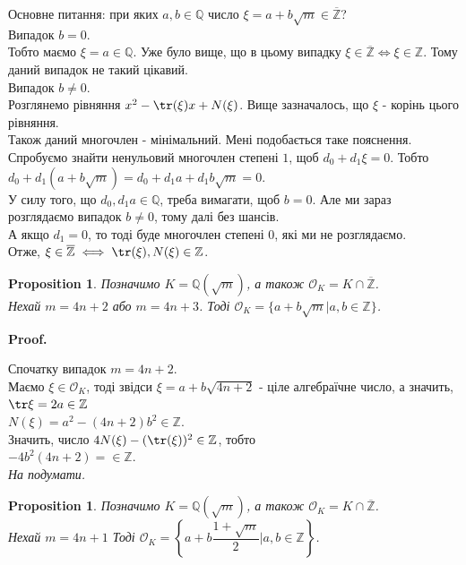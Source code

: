 \documentclass[a4paper, 10pt]{article}
\makeatletter
\theoremstyle{theoremdd}
\theoremstyle{theoremdd}
\theoremstyle{theoremdd}
\theoremstyle{theoremdd}
\theoremstyle{theoremdd}
\newtheorem{proposition}[theorem]{Proposition}
\theoremstyle{theoremdd}
\theoremstyle{theoremdd}
\theoremstyle{theoremdd}
\renewenvironment{proof}[1][Proof.\\]{\par
\pushQED{\hfill \qed}%
\normalfont \topsep6\p@\@plus6\p@\relax
\trivlist
\item\relax
{\bfseries
#1\@addpunct{.}}\hspace\labelsep\ignorespaces
}{%
\popQED\endtrivlist\@endpefalse
}
\makeatother
\begin{document}
Основне питання: при яких $a,b \in \mathbb{Q}$ число $\xi = a + b\sqrt{m} \in \overline{\mathbb{Z}}$?\\
Випадок $b = 0$.\\
Тобто маємо $\xi = a \in \mathbb{Q}$. Уже було вище, що в цьому випадку $\xi \in \overline{\mathbb{Z}} \iff \xi \in \mathbb{Z}$. Тому даний випадок не такий цікавий.
\bigskip \\
Випадок $b \neq 0$.\\
Розглянемо рівняння $x^2 - \tr(\xi)x + N(\xi)$. Вище зазначалось, що $\xi$ - корінь цього рівняння.\\
Також даний многочлен - мінімальний. Мені подобається таке пояснення.\\
Спробуємо знайти ненульовий многочлен степені $1$, щоб $d_0+d_1 \xi = 0$. Тобто\\
$d_0 + d_1 (a+b\sqrt{m}) = d_0 +d_1 a + d_1 b \sqrt{m} = 0$.\\
У силу того, що $d_0,d_1a \in \mathbb{Q}$, треба вимагати, щоб $b = 0$. Але ми зараз розглядаємо випадок $b \neq 0$, тому далі без шансів.\\
А якщо $d_1 = 0$, то тоді буде многочлен степені $0$, які ми не розглядаємо.\\
Отже, $\xi \in \overline{\mathbb{Z}} \iff \tr(\xi), N(\xi) \in \mathbb{Z}$.

\begin{proposition}
Позначимо $K = \mathbb{Q}(\sqrt{m})$, а також $\mathcal{O}_K = K \cap \overline{\mathbb{Z}}$.\\
Нехай $m = 4n+2$ або $m = 4n+3$. Тоді $\mathcal{O}_K = \{a + b \sqrt{m} | a,b \in \mathbb{Z} \}$.
\end{proposition}

\begin{proof}
Спочатку випадок $m = 4n+2$. \\
Маємо $\xi \in \mathcal{O}_K$, тоді звідси $\xi = a+b \sqrt{4n+2}$ - ціле алгебраїчне число, а значить, \\
$\tr \xi = 2a \in \mathbb{Z}$\\
$N(\xi) = a^2-(4n+2)b^2 \in \mathbb{Z}$.\\
Значить, число $4N(\xi) - (\tr(\xi))^2 \in \mathbb{Z}$, тобто\\
$-4b^2(4n+2) = \in \mathbb{Z}$.\\
\textit{На подумати.}
\end{proof}

\begin{proposition}
Позначимо $K = \mathbb{Q}(\sqrt{m})$, а також $\mathcal{O}_K = K \cap \overline{\mathbb{Z}}$.\\
Нехай $m = 4n+1$ Тоді $\mathcal{O}_K = \left\{a + b \dfrac{1+\sqrt{m}}{2} | a,b \in \mathbb{Z} \right\}$.
\end{proposition}
\end{document}
